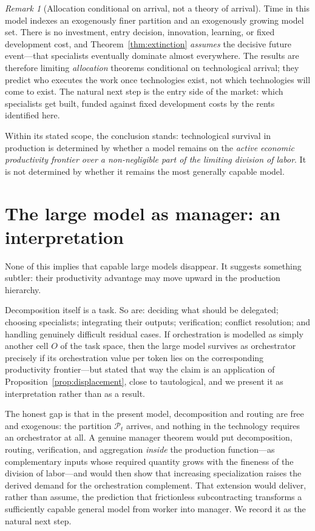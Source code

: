\documentclass[11pt]{article}
\theoremstyle{definition}
\theoremstyle{remark}
\newtheorem{remark}{Remark}
\begin{document}
\begin{remark}[Allocation conditional on arrival, not a theory of arrival]
\label{rem:conditional}
Time in this model indexes an exogenously finer partition and an exogenously growing model set. There is no investment, entry decision, innovation, learning, or fixed development cost, and Theorem~\ref{thm:extinction} \emph{assumes} the decisive future event---that specialists eventually dominate almost everywhere. The results are therefore limiting \emph{allocation} theorems conditional on technological arrival; they predict who executes the work once technologies exist, not which technologies will come to exist. The natural next step is the entry side of the market: which specialists get built, funded against fixed development costs by the rents identified here.
\end{remark}

Within its stated scope, the conclusion stands: technological survival in production is determined by whether a model remains on the \emph{active economic productivity frontier over a non-negligible part of the limiting division of labor}. It is not determined by whether it remains the most generally capable model.

\section{The large model as manager: an interpretation}
\label{sec:manager}

None of this implies that capable large models disappear. It suggests something subtler: their productivity advantage may move upward in the production hierarchy.

Decomposition itself is a task. So are: deciding what should be delegated; choosing specialists; integrating their outputs; verification; conflict resolution; and handling genuinely difficult residual cases. If orchestration is modelled as simply another cell $O$ of the task space, then the large model survives as orchestrator precisely if its orchestration value per token lies on the corresponding productivity frontier---but stated that way the claim is an application of Proposition~\ref{prop:displacement}, close to tautological, and we present it as interpretation rather than as a result.

The honest gap is that in the present model, decomposition and routing are free and exogenous: the partition $\mathcal{P}_t$ arrives, and nothing in the technology requires an orchestrator at all. A genuine manager theorem would put decomposition, routing, verification, and aggregation \emph{inside} the production function---as complementary inputs whose required quantity grows with the fineness of the division of labor---and would then show that increasing specialization raises the derived demand for the orchestration complement. That extension would deliver, rather than assume, the prediction that frictionless subcontracting transforms a sufficiently capable general model from worker into manager. We record it as the natural next step.
\end{document}
